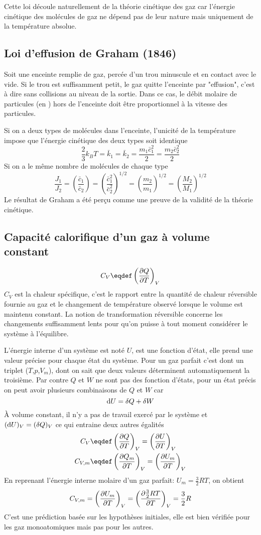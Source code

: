 Cette loi découle naturellement de la théorie cinétique des gaz car
l'énergie cinétique des molécules de gaz ne dépend pas de leur nature mais
uniquement de la température absolue.

\subsection{Loi d'effusion de Graham (1846)}
Soit une enceinte remplie de gaz, percée d'un trou minuscule et
en contact avec le vide.
Si le trou est suffisamment petit, le gaz quitte l'enceinte par "effusion",
c'est à dire sans collisions au niveau de la sortie.
Dans ce cas, le débit molaire de particules (\joule en \mole\per\second)
hors de l'enceinte doit être proportionnel à la vitesse des particules.

Si on a deux types de molécules dans l'enceinte,
l'unicité de la température impose que
l'énergie cinétique des deux types soit identique
\[ \frac 23 k_BT = \bar k_1 = \bar k_2 = \frac{m_1\bar c_1^2}{2} =
\frac{m_2\bar c_2^2}{2} \]
Si on a le même nombre de molécules de chaque type
\[ \frac{J_1}{J_2} = \left(\frac{\bar c_1}{\bar c_2}\right) =
\left(\frac{\bar c_1^2}{\bar c_2^2}\right)^{1/2} =
\left(\frac{m_2}{m_1}\right)^{1/2} =
\left(\frac{M_2}{M_1}\right)^{1/2} \]
Le résultat de Graham a été perçu comme
une preuve de la validité de la théorie cinétique.

\subsection{Capacité calorifique d'un gaz à volume constant}
\[ C_V \eqdef \left(\fpart{Q}{T} \right)_V \]
$C_V$ est la chaleur spécifique,
c'est le rapport entre la quantité de chaleur réversible fournie au gaz et
le changement de température observé lorsque le volume est maintenu constant.
La notion de transformation réversible concerne les changements suffisamment
lents pour qu'on puisse à tout moment considérer le système à l'équilibre.

L'énergie interne d'un système est noté $U$, est une fonction d'état,
elle prend une valeur précise pour chaque état du système.
Pour un gaz parfait c'est dont un triplet ($T$,$p$,$V_m$),
dont on sait que deux valeurs déterminent automatiquement la troisième.
Par contre $Q$ et $W$ ne sont pas des fonction d'états,
pour un état précis on peut avoir plusieurs combinaisons de $Q$ et $W$ car
\[ \operatorname{d}\! U = \delta Q + \delta W \]
À volume constant, il n'y a pas de travail exercé par le système et
$(\operatorname{d}\! U)_V = (\delta Q)_V$ ce qui entraine deux autres égalités
\begin{align*}
  C_V & \eqdef \left(\fpart{Q}{T}\right)_V =
  \left(\fpart{U}{T}\right)_V\\
  C_{V,m} & \eqdef \left(\fpart{Q_m}{T}\right)_V =
  \left(\fpart{U_m}{T}\right)_V
\end{align*}
En reprenant l'énergie interne molaire d'un gaz parfait:
$U_m = \frac 32 RT$, on obtient
\[ C_{V,m} = \left(\frac{\partial U_m}{\partial T}\right)_V =
\left(\frac{\partial \frac 32 RT}{\partial T}\right)_V = \frac 32R \]
C'est une prédiction basée sur les hypothèses initiales,
elle est bien vérifiée pour les gaz monoatomiques mais pas pour les autres.

